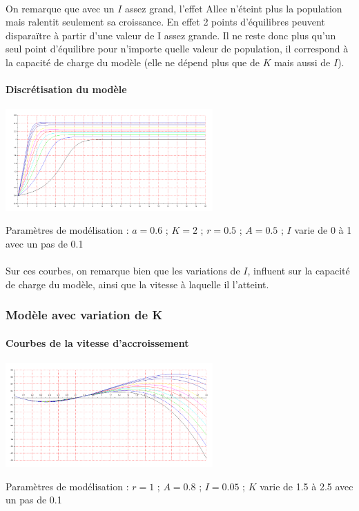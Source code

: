 \documentclass{article}
\begin{document}
\paragraph{}
On remarque que avec un $I$ assez grand, l'effet Allee n'éteint plus la population mais ralentit seulement sa croissance. En effet 2 points d'équilibres peuvent disparaïtre à partir d'une valeur de I assez grande. Il ne reste donc plus qu'un seul point d'équilibre pour n'importe quelle valeur de population, il correspond à la capacité de charge du modèle (elle ne dépend plus que de $K$ mais aussi de $I$).
\newpage

\paragraph{Discrétisation du modèle}
\begin{center}
\includegraphics[width=300px]{img/part1/TrajI.png}
\end{center}
Paramètres de modélisation : $a=0.6$ ; $K=2$  ; $r=0.5$ ; $A=0.5$ ; $I$ varie de 0 à 1 avec un pas de 0.1
\paragraph{}
Sur ces courbes, on remarque bien que les variations de $I$, influent sur la capacité de charge du modèle, ainsi que la vitesse à laquelle il l'atteint.

\subsubsection{Modèle avec variation de K}

\paragraph{Courbes de la vitesse d'accroissement}
\begin{center}
\includegraphics[width=300px]{img/part1/AlleeK.png}
\end{center}
Paramètres de modélisation : $r=1$ ; $A=0.8$ ; $I=0.05$ ; $K$ varie de 1.5 à 2.5 avec un pas de 0.1
\end{document}
